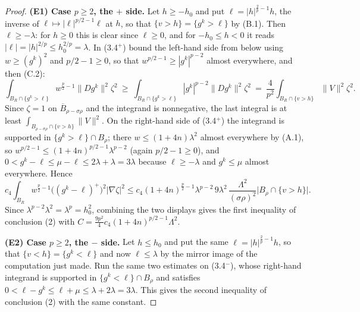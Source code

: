 \begin{proof}
\textbf{(E1) Case $p\ge2$, the $+$ side.}  Let $h\ge-h_0$ and put
$\ell=|h|^{\frac2p-1}h$, the inverse of $\ell\mapsto|\ell|^{p/2-1}\ell$ at $h$,
so that $\{v>h\}=\{g^k>\ell\}$ by (B.1).  Then $\ell\ge-\lambda$: for $h\ge0$
this is clear since $\ell\ge0$, and for $-h_0\le h<0$ it reads
$|\ell|=|h|^{2/p}\le h_0^{2/p}=\lambda$.  In (3.4$^+$) bound the left-hand side
from below using $w\ge(g^k)^2$ and $p/2-1\ge0$, so that
$w^{p/2-1}\ge|g^k|^{p-2}$ almost everywhere, and then (C.2):
\[
\int_{B_R\cap\{g^k>\ell\}}w^{\frac p2-1}\|Dg^k\|^2\zeta^2
\ \ge\ \int_{B_R\cap\{g^k>\ell\}}|g^k|^{p-2}\|Dg^k\|^2\zeta^2
\ =\ \frac4{p^2}\int_{B_R\cap\{v>h\}}\|V\|^2\zeta^2 .
\]
Since $\zeta=1$ on $\overline B_{\rho-\sigma\rho}$ and the integrand is
nonnegative, the last integral is at least
$\int_{B_{\rho-\sigma\rho}\cap\{v>h\}}\|V\|^2$.  On the right-hand side of
(3.4$^+$) the integrand is supported in $\{g^k>\ell\}\cap B_\rho$; there
$w\le(1+4n)\lambda^2$ almost everywhere by (A.1), so
$w^{p/2-1}\le(1+4n)^{p/2-1}\lambda^{p-2}$ (again $p/2-1\ge0$), and
$0<g^k-\ell\le\mu-\ell\le2\lambda+\lambda=3\lambda$ because $\ell\ge-\lambda$
and $g^k\le\mu$ almost everywhere.  Hence
\[
c_4\int_{B_R}w^{\frac p2-1}\bigl((g^k-\ell)^+\bigr)^2|\nabla\zeta|^2
\le c_4(1+4n)^{\frac p2-1}\lambda^{p-2}\,9\lambda^2\,
\frac{\Lambda^2}{(\sigma\rho)^2}\bigl|B_\rho\cap\{v>h\}\bigr| .
\]
Since $\lambda^{p-2}\lambda^2=\lambda^p=h_0^2$, combining the two displays gives
the first inequality of conclusion (2) with
$C=\tfrac{9p^2}4c_4(1+4n)^{p/2-1}\Lambda^2$.

\textbf{(E2) Case $p\ge2$, the $-$ side.}  Let $h\le h_0$ and put the same
$\ell=|h|^{\frac2p-1}h$, so that $\{v<h\}=\{g^k<\ell\}$ and now $\ell\le\lambda$
by the mirror image of the computation just made.  Run the same two estimates on
(3.4$^-$), whose right-hand integrand is supported in $\{g^k<\ell\}\cap B_\rho$
and satisfies $0<\ell-g^k\le\ell+\mu\le\lambda+2\lambda=3\lambda$.  This gives
the second inequality of conclusion (2) with the same constant.


\end{proof}
